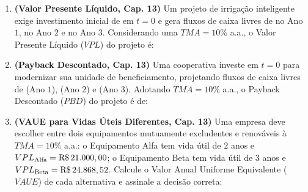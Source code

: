 \begin{enumerate}[leftmargin=1.6em, itemsep=8pt]
  \item \textbf{(Valor Presente Líquido, Cap. 13)} Um projeto de irrigação inteligente exige investimento inicial de  em $t=0$ e gera fluxos de caixa livres de  no Ano $1$,  no Ano $2$ e  no Ano $3$. Considerando uma $TMA = 10\%$ a.a., o Valor Presente Líquido ($VPL$) do projeto é:

  \item \textbf{(Payback Descontado, Cap. 13)} Uma cooperativa investe  em $t=0$ para modernizar sua unidade de beneficiamento, projetando fluxos de caixa livres de  (Ano $1$),  (Ano $2$) e  (Ano $3$). Adotando $TMA = 10\%$ a.a., o Payback Descontado ($PBD$) do projeto é de:

  \item \textbf{(VAUE para Vidas Úteis Diferentes, Cap. 13)} Uma empresa deve escolher entre dois equipamentos mutuamente excludentes e renováveis à $TMA = 10\%$ a.a.: o Equipamento Alfa tem vida útil de $2$ anos e $VPL_{\text{Alfa}} = \text{R\$\,}{21.000,00}$; o Equipamento Beta tem vida útil de $3$ anos e $VPL_{\text{Beta}} = \text{R\$\,}{24.868,52}$. Calcule o Valor Anual Uniforme Equivalente ($VAUE$) de cada alternativa e assinale a decisão correta:


\end{enumerate}
